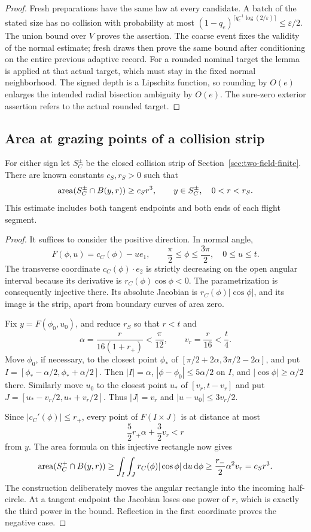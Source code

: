 \begin{proof}
Fresh preparations have the same law at every candidate.  A batch
of the stated size has no collision with probability at most
$(1-q_e)^{\lceil q_e^{-1}\log(2/\varepsilon)\rceil}
\le\varepsilon/2$.  The union bound over $V$ proves the assertion.
The coarse event fixes the validity of the normal estimate; fresh
draws then prove the same bound after conditioning on the entire
previous adaptive record.  For a rounded nominal target the lemma
is applied at that actual target, which must stay in the fixed
normal neighborhood.  The signed depth is a Lipschitz function,
so rounding by $O(e)$ enlarges the intended radial bisection
ambiguity by $O(e)$.  The sure-zero exterior assertion refers to
the actual rounded target.
\end{proof}

\subsection{Area at grazing points of a collision strip}
\begin{lemma}
\label{lem:two-field-strip-details}
For either sign let $S_C^\pm$ be the closed collision strip of
Section~\ref{sec:two-field-finite}.  There are known constants
$c_S,r_S>0$ such that
\[
        \operatorname{area}(S_C^\pm\cap B(y,r))\ge c_S r^3,
              \qquad y\in S_C^\pm,\quad 0<r<r_S.
\]
This estimate includes both tangent endpoints and both ends of each
flight segment.
\end{lemma}
\begin{proof}
It suffices to consider the positive direction.  In normal angle,
\[
 F(\phi,u)=c_C(\phi)-u e_1,
   \qquad \frac\pi2\le\phi\le\frac{3\pi}2,
   \quad 0\le u\le t.
\]
The transverse coordinate $c_C(\phi)\cdot e_2$ is strictly
decreasing on the open angular interval because its derivative is
$r_C(\phi)\cos\phi<0$.  The parametrization is consequently
injective there.  Its absolute Jacobian is
$r_C(\phi)|\cos\phi|$, and its image is the strip, apart from
boundary curves of area zero.

Fix $y=F(\phi_0,u_0)$, and reduce $r_S$ so that
$r<t$ and
\[
 \alpha=\frac{r}{16(1+r_+)}<\frac{\pi}{12},
       \qquad v_r=\frac r{16}<\frac t4.
\]
Move $\phi_0$, if necessary, to the closest point $\phi_*$ of
$[\pi/2+2\alpha,3\pi/2-2\alpha]$, and put
$I=[\phi_*-\alpha/2,\phi_*+\alpha/2]$.
Then $|I|=\alpha$, $|\phi-\phi_0|\le5\alpha/2$ on $I$,
and $|\cos\phi|\ge\alpha/2$ there.  Similarly move $u_0$
to the closest point $u_*$ of $[v_r,t-v_r]$ and put
$J=[u_*-v_r/2,u_*+v_r/2]$.
Thus $|J|=v_r$ and $|u-u_0|\le3v_r/2$.

Since $|c_C'(\phi)|\le r_+$, every point of $F(I\times J)$
is at distance at most
\[
        \frac52r_+\alpha+\frac32v_r<r
\]
from $y$.  The area formula on this injective rectangle now gives
\[
 \operatorname{area}(S_C^+\cap B(y,r))
 \ge\int_I\int_J r_C(\phi)|\cos\phi|\,\mathrm d u\,\mathrm d\phi
 \ge\frac{r_-}{2}\alpha^2v_r=c_Sr^3.
\]
The construction deliberately moves the angular rectangle into the
incoming half-circle.  At a tangent endpoint the Jacobian loses one
power of $r$, which is exactly the third power in the bound.
Reflection in the first coordinate proves the negative case.
\end{proof}

